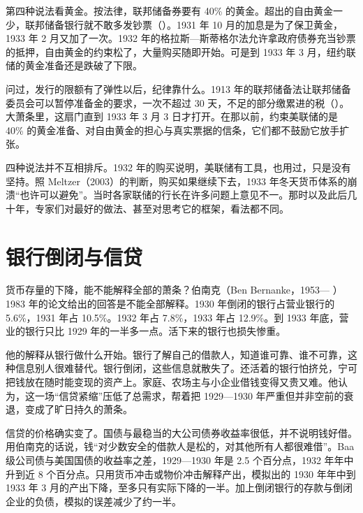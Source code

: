 第四种说法看黄金。按法律，联邦储备券要有 40\% 的黄金。超出的自由黄金一少，联邦储备银行就不敢多发钞票（）\cite{frhgold}。1931 年 10 月的加息是为了保卫黄金，1933 年 2 月又加了一次\cite{frhpanic2}。1932 年的格拉斯—斯蒂格尔法允许拿政府债券充当钞票的抵押，自由黄金的约束松了，大量购买随即开始\cite{frhba32}。可是到 1933 年 3 月，纽约联储的黄金准备还是跌破了下限\cite{frhholiday}。

问过，发行的限额有了弹性以后，纪律靠什么。1913 年的联邦储备法让联邦储备委员会可以暂停准备金的要求，一次不超过 30 天，不足的部分缴累进的税（）。大萧条里，这扇门直到 1933 年 3 月 3 日才打开\cite{frhpanic2}。在那以前，约束美联储的是 40\% 的黄金准备、对自由黄金的担心与真实票据的信条，它们都不鼓励它放手扩张。

四种说法并不互相排斥。1932 年的购买说明，美联储有工具，也用过，只是没有坚持。照 Meltzer（2003）的判断，购买如果继续下去，1933 年冬天货币体系的崩溃“也许可以避免”\cite{frhba32}。当时各家联储的行长在许多问题上意见不一。那时以及此后几十年，专家们对最好的做法、甚至对思考它的框架，看法都不同\cite{frhgd}。

\section{银行倒闭与信贷}\label{sec:depressionus-credit}

货币存量的下降，能不能解释全部的萧条？伯南克（Ben Bernanke，1953— ）1983 年的论文给出的回答是不能全部解释\cite{bernanke1983,loc28}。1930 年倒闭的银行占营业银行的 5.6\%，1931 年占 10.5\%。1932 年占 7.8\%，1933 年占 12.9\%。到 1933 年底，营业的银行只比 1929 年的一半多一点\cite{bernanke1983}。活下来的银行也损失惨重\cite{bernanke1983}。

他的解释从银行做什么开始。银行了解自己的借款人，知道谁可靠、谁不可靠，这种信息别人很难替代。银行倒闭，这些信息就散失了。还活着的银行怕挤兑，宁可把钱放在随时能变现的资产上\cite{bernanke1983}。家庭、农场主与小企业借钱变得又贵又难\cite{bernanke1983}。他认为，这一场“信贷紧缩”压低了总需求，帮着把 1929—1930 年严重但并非空前的衰退，变成了旷日持久的萧条\cite{bernanke1983}。

信贷的价格确实变了。国债与最稳当的大公司债券收益率很低，并不说明钱好借。用伯南克的话说，钱“对少数安全的借款人是松的，对其他所有人都很难借”\cite{bernanke1983}。Baa 级公司债与美国国债的收益率之差，1929—1930 年是 2.5 个百分点，1932 年年中升到近 8 个百分点\cite{bernanke1983}。只用货币冲击或物价冲击解释产出，模拟出的 1930 年年中到 1933 年 3 月的产出下降，至多只有实际下降的一半\cite{bernanke1983}。加上倒闭银行的存款与倒闭企业的负债，模拟的误差减少了约一半\cite{bernanke1983}。

